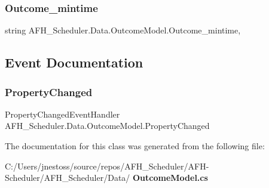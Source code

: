 \mbox{\label{class_a_f_h___scheduler_1_1_data_1_1_outcome_model_a94315d15e5ad2b7c9df9a297223cf6ba}} 
\subsubsection{Outcome\_mintime}
{\footnotesize\ttfamily string A\+F\+H\+\_\+\+Scheduler.\+Data.\+Outcome\+Model.\+Outcome\+\_\+mintime\hspace{0.3cm}{\ttfamily [get]}, {\ttfamily [set]}}



\subsection{Event Documentation}
\mbox{\label{class_a_f_h___scheduler_1_1_data_1_1_outcome_model_ad57fbd59d9623c588b56b44ca0c1af23}} 
\subsubsection{PropertyChanged}
{\footnotesize\ttfamily Property\+Changed\+Event\+Handler A\+F\+H\+\_\+\+Scheduler.\+Data.\+Outcome\+Model.\+Property\+Changed}



The documentation for this class was generated from the following file\+:\begin{DoxyCompactItemize}
\item 
C\+:/\+Users/jnestoss/source/repos/\+A\+F\+H\+\_\+\+Scheduler/\+A\+F\+H-\/\+Scheduler/\+A\+F\+H\+\_\+\+Scheduler/\+Data/\textbf{ Outcome\+Model.\+cs}\end{DoxyCompactItemize}
